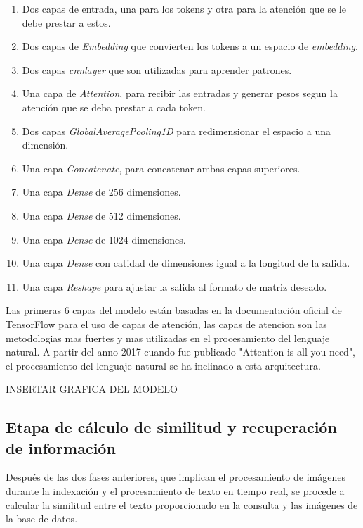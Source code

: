 \begin{enumerate}
    \item Dos capas de entrada, una para los tokens y otra para la atención que se le debe prestar a estos.
    \item Dos capas de \textit{Embedding} que convierten los tokens a un espacio de \textit{embedding}.
    \item Dos capas \textit{cnnlayer} que son utilizadas para aprender patrones.
    \item Una capa de \textit{Attention}, para recibir las entradas y generar pesos segun la atenci\'on que se deba prestar a cada token.
    \item Dos capas \textit{GlobalAveragePooling1D} para redimensionar el espacio a una dimensión.
    \item Una capa \textit{Concatenate}, para concatenar ambas capas superiores.
    \item Una capa \textit{Dense} de 256 dimensiones.
    \item Una capa \textit{Dense} de 512 dimensiones.
    \item Una capa \textit{Dense} de 1024 dimensiones.
    \item Una capa \textit{Dense} con catidad de dimensiones igual a la longitud de la salida.
    \item Una capa \textit{Reshape} para ajustar la salida al formato de matriz deseado.
\end{enumerate}
Las primeras 6 capas del modelo están basadas en la documentación oficial de TensorFlow para el uso de capas de atención, las capas de atencion son las metodologias mas fuertes y mas utilizadas en el procesamiento del lenguaje natural. A partir del anno 2017 cuando fue publicado "Attention is all you need", el procesamiento del lenguaje natural se ha inclinado a esta arquitectura.

INSERTAR GRAFICA DEL MODELO

\subsection*{Etapa de cálculo de similitud y recuperación de información}

Después de las dos fases anteriores, que implican el procesamiento de imágenes durante la indexación y el procesamiento de texto en tiempo real, se procede a calcular la similitud entre el texto proporcionado en la consulta y las imágenes de la base de datos.


